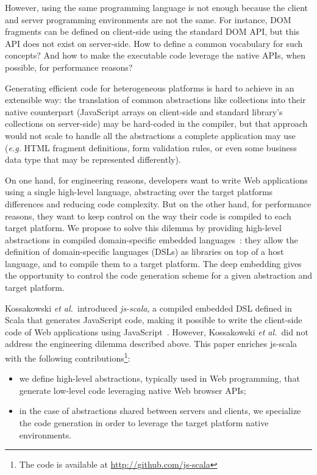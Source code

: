\documentclass[preprint]{sigplanconf}
\newcommand{\eg}{\emph{e.g.}}
\newcommand{\etal}{\emph{et al.~}}
\begin{document}
However, using the same programming language is not enough because the client and server programming
environments are not the same. For instance, DOM fragments can be defined on client-side using the
standard DOM API, but this API does not exist on server-side. How to define a common vocabulary for
such concepts? And how to make the executable code leverage the native APIs, when possible, for
performance reasons?

Generating efficient code for heterogeneous platforms is hard to achieve in an extensible way: the
translation of common abstractions like collections into their native counterpart (JavaScript arrays
on client-side and standard library's collections on server-side) may be hard-coded in the compiler,
but that approach would not scale to handle all the abstractions a complete application may use
(\eg{} HTML fragment definitions, form validation rules, or even some business data type that may be
represented differently).

On one hand, for engineering reasons, developers want to write Web applications using a single
high-level language, abstracting over the target platforms differences and reducing code complexity.
But on the other hand, for performance reasons, they want to keep control on the way their code is
compiled to each target platform. We propose to solve this dilemma by providing high-level
abstractions in compiled domain-specific embedded languages~\cite{Elliott2003_Compiling}: they allow
the definition of domain-specific languages (DSLs) as libraries on top of a host language, and to
compile them to a target platform. The deep embedding gives the opportunity to control the code
generation scheme for a given abstraction and target platform.

Kossakowski \etal introduced \emph{js-scala}, a compiled embedded DSL defined in Scala that
generates JavaScript code, making it possible to write the client-side code of Web applications
using JavaScript~\cite{Kossakowski12_JsDESL}. However, Kossakowski \etal did not address the
engineering dilemma described above. This paper enriches js-scala with the following
contributions\footnote{The code is available at
\href{http://github.com/js-scala}{http://github.com/js-scala}}:

\begin{itemize}
 \item we define high-level abstractions, typically used in Web programming, that generate low-level
code leveraging native Web browser APIs;
 \item in the case of abstractions shared between servers and clients, we specialize the code
generation in order to leverage the target platform native environments.
\end{itemize}
\end{document}
